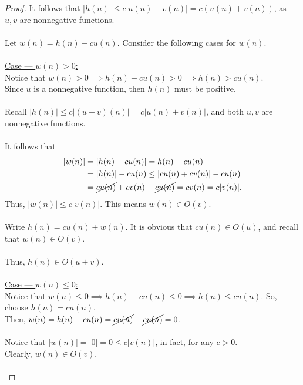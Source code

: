\documentclass[12pt]{article}
\begin{document}
\begin{proof}
    It follows that \( |h(n)| \leq c|u(n) + v(n)| = c(u(n) + v(n)) \), as \( u, v\) are nonnegative functions. \\
    \\
    Let \( w(n) = h(n) - cu(n) \). Consider the following cases for \( w(n) \). \\
    \\
    \underline{Case — \( w(n) > 0 \):} \\
    Notice that \( w(n) > 0 \implies h(n) - cu(n) > 0 \implies h(n) > cu(n) \). \\
    Since \( u \) is a nonnegative function, then \( h(n) \) must be positive. \\
    \\
    Recall \( |h(n)| \leq c|(u + v)(n)| = c|u(n) + v(n)| \), and both \( u, v \) are nonnegative functions. \\
    \\
    It follows that
    \begin{equation*}
        \begin{aligned}
            |w(n)| &= |h(n) - cu(n)| = h(n) - cu(n) \\
            &= |h(n)| - cu(n) \leq |cu(n) + cv(n)| - cu(n) \\
            &= \cancel{cu(n)} + cv(n) - \cancel{cu(n)} = cv(n) = c|v(n)| \text{.}
        \end{aligned}
    \end{equation*}
    Thus, \( |w(n)| \leq c|v(n)| \). This means \( w(n) \in O(v) \). \\
    \\
    Write \( h(n) = cu(n) + w(n) \). It is obvious that \( cu(n) \in O(u) \), and recall that \( w(n) \in O(v) \). \\
    \\
    Thus, \( h(n) \in O(u + v) \). \\
    \\
    \underline{Case — \( w(n) \leq 0 \):} \\
    Notice that \( w(n) \leq 0 \implies h(n) - cu(n) \leq 0 \implies h(n) \leq cu(n) \). So, choose \( h(n) = cu(n) \). \\
    Then, \( w(n) = h(n) - cu(n) = \cancel{cu(n)} - \cancel{cu(n)} = 0 \). \\
    \\
    Notice that \( |w(n)| = |0| = 0 \leq c|v(n)| \), in fact, for any \( c > 0 \). \\
    Clearly, \( w(n) \in O(v) \). \\
    \\

\end{proof}
\end{document}
